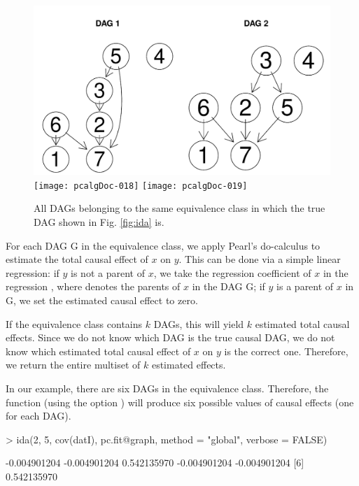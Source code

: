 \documentclass[article]{jss}
\begin{document}
\begin{figure}
  \begin{center}
\includegraphics{pcalgDoc-017}
\texttt{[image: pcalgDoc-018]}
\texttt{[image: pcalgDoc-019]}
\caption{All DAGs belonging to the same equivalence class in which the true
  DAG shown in Fig. \ref{fig:ida} is.}
\label{fig:allDags}
\end{center}
\end{figure}

For each DAG G in the equivalence class, we apply Pearl's do-calculus to
estimate the total causal effect of $x$ on $y$. This can be done via a
simple linear regression: if $y$ is not a parent of $x$, we take the
regression coefficient of $x$ in the regression , where  denotes the parents of $x$ in the DAG G; if
$y$ is a parent of $x$ in G, we set the estimated causal effect to zero.

If the equivalence class contains $k$ DAGs, this will yield $k$ estimated
total causal effects. Since we do not know which DAG is the true causal
DAG, we do not know which estimated total causal effect of $x$ on $y$ is
the correct one. Therefore, we return the entire multiset of $k$ estimated
effects.

In our example, there are six DAGs in the equivalence class. Therefore, the
function  (using the option ) will
produce six possible values of causal effects (one for each DAG).

\begin{Schunk}
\begin{Sinput}
>      ida(2, 5, cov(datI), pc.fit@graph, method = "global", verbose = FALSE)
\end{Sinput}
\begin{Soutput}
[1] -0.004901204 -0.004901204  0.542135970 -0.004901204 -0.004901204
[6]  0.542135970
\end{Soutput}
\end{Schunk}
\end{document}
